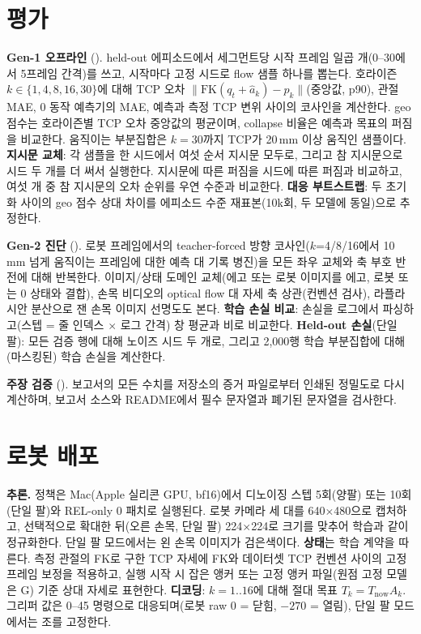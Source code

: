 \documentclass[conference,10pt]{IEEEtran}
\newcommand{\mm}{\,mm\xspace}
\begin{document}
\section{평가}\label{sec:eval}
\textbf{Gen-1 오프라인} (). held-out 에피소드에서 세그먼트당 시작 프레임 일곱 개(0--30에서 5프레임
간격)를 쓰고, 시작마다 고정 시드로 flow 샘플 하나를 뽑는다. 호라이즌 $k\in\{1,4,8,16,30\}$에 대해 TCP 오차
$\lVert\mathrm{FK}(q_t+\hat a_k)-p_k\rVert$(중앙값, p90), 관절 MAE, 0 동작 예측기의 MAE, 예측과 측정 TCP 변위 사이의 코사인을
계산한다. geo 점수는 호라이즌별 TCP 오차 중앙값의 평균이며, collapse 비율은 예측과 목표의 퍼짐을 비교한다. 움직이는 부분집합은
$k{=}30$까지 TCP가 20\mm{} 이상 움직인 샘플이다. \textbf{지시문 교체}: 각 샘플을 한 시드에서 여섯 순서 지시문 모두로, 그리고 참
지시문으로 시드 두 개를 더 써서 실행한다. 지시문에 따른 퍼짐을 시드에 따른 퍼짐과 비교하고, 여섯 개 중 참 지시문의 오차 순위를
우연 수준과 비교한다. \textbf{대응 부트스트랩}: 두 초기화 사이의 geo 점수 상대 차이를 에피소드 수준 재표본(10k회, 두 모델에 동일)으로
추정한다.

\textbf{Gen-2 진단} (). 로봇 프레임에서의 teacher-forced 방향 코사인($k$=4/8/16에서 10\mm{} 넘게 움직이는 프레임에
대한 예측 대 기록 병진)을 모든 좌우 교체와 축 부호 반전에 대해 반복한다. 이미지/상태 도메인 교체(에고 또는 로봇 이미지를 에고,
로봇 또는 0 상태와 결합), 손목 비디오의 optical flow 대 자세 축 상관(컨벤션 검사), 라플라시안 분산으로 잰 손목 이미지 선명도도
본다. \textbf{학습 손실 비교}: 손실을 로그에서 파싱하고(스텝 = 줄 인덱스 $\times$ 로그 간격) 창 평균과 비로 비교한다.
\textbf{Held-out 손실}(단일 팔): 모든 검증 행에 대해 노이즈 시드 두 개로, 그리고 2{,}000행 학습 부분집합에 대해 (마스킹된) 학습
손실을 계산한다.

\textbf{주장 검증} (). 보고서의 모든 수치를 저장소의 증거 파일로부터 인쇄된 정밀도로 다시 계산하며,
보고서 소스와 README에서 필수 문자열과 폐기된 문자열을 검사한다.

\section{로봇 배포}\label{sec:deploy}
\textbf{추론.} 정책은 Mac(Apple 실리콘 GPU, bf16)에서 디노이징 스텝 5회(양팔) 또는 10회(단일 팔)와 REL-only 0 패치로 실행된다. 로봇
카메라 세 대를 640$\times$480으로 캡처하고, 선택적으로 확대한 뒤(오른 손목, 단일 팔) 224$\times$224로 크기를 맞추어 학습과 같이
정규화한다. 단일 팔 모드에서는 왼 손목 이미지가 검은색이다. \textbf{상태}는 학습 계약을 따른다. 측정 관절의 FK로 구한 TCP 자세에
FK와 데이터셋 TCP 컨벤션 사이의 고정 프레임 보정을 적용하고, 실행 시작 시 잡은 앵커 또는 고정 앵커 파일(원점 고정 모델은 G) 기준
상대 자세로 표현한다. \textbf{디코딩}: $k=1..16$에 대해 절대 목표 $T_k=T_\text{now}A_k$. 그리퍼 값은 0--45 명령으로 대응되며(로봇
raw 0 = 닫힘, $-270$ = 열림), 단일 팔 모드에서는 조를 고정한다.
\end{document}
